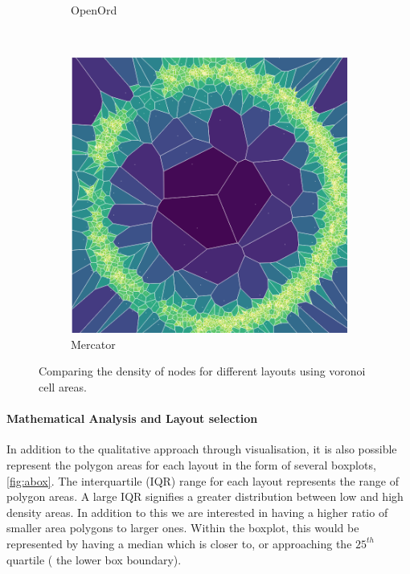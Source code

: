 \begin{figure}[H]
\begin{subfigure}[b]{.49\textwidth}
         \caption{OpenOrd}
         \label{fig:aoo}
     \end{subfigure}\\
     \begin{subfigure}[b]{.49\textwidth}
         \centering \includegraphics[width=\textwidth,angle=0]{figures_c1/area/fill_mercloc.png}
         \caption{Mercator}
         \label{fig:amer}
     \end{subfigure}

        \caption{Comparing the density of nodes for different layouts using voronoi cell areas.}
        \label{fig:vornoicompare}
\end{figure}

\paragraph{Mathematical Analysis and Layout selection}
In addition to the qualitative approach through visualisation, it is also possible represent the polygon areas for each layout in the form of several boxplots, \autoref{fig:abox}. The interquartile (IQR) range for each layout represents the range of polygon areas. A large IQR signifies a greater distribution between low and high density  areas. 
In addition to this we are interested in having a higher ratio of smaller area polygons to larger ones. Within the boxplot, this would be represented by having a median which is closer to, or approaching the $25^{th}$ quartile ( the lower box boundary).


